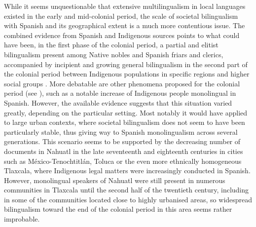 \documentclass[output=paper,hidelinks]{langscibook}
\begin{document}
While it seems unquestionable that extensive multilingualism in local languages existed in the early and mid-colonial period, the scale of societal bilingualism with Spanish and its geographical extent is a much more contentious issue. The combined evidence from Spanish and Indigenous sources points to what could have been, in the first phase of the colonial period, a partial and elitist bilingualism present among Native nobles and Spanish friars and clerics, accompanied by incipient and growing general bilingualism in the second part of the colonial period between Indigenous populations in specific regions and higher social groups \citep[945, Tab. 15]{zimmermann2010}. More debatable are other phenomena proposed for the colonial period (see \citealt[945]{zimmermann2010}), such as a notable increase of Indigenous people monolingual in Spanish. However, the available evidence suggests that this situation varied greatly, depending on the particular setting. Most notably it would have applied to large urban contexts, where societal bilingualism does not seem to have been particularly stable, thus giving way to Spanish monolingualism across several generations. This scenario seems to be supported by the decreasing number of documents in Nahuatl in the late seventeenth and eighteenth centuries in cities such as México-Tenochtitlán, Toluca or the even more ethnically homogeneous Tlaxcala, where Indigenous legal matters were increasingly conducted in Spanish. However, monolingual speakers of Nahuatl were still present in numerous communities in Tlaxcala until the second half of the twentieth century, including in some of the communities located close to highly urbanised areas, so widespread bilingualism toward the end of the colonial period in this area seems rather improbable.
\end{document}
